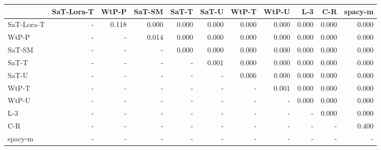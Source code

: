 \begin{tabular}{lrrrrrrrrrr}
\toprule
 & SaT-Lora-T & WtP-P & SaT-SM & SaT-T & SaT-U & WtP-T & WtP-U & L-3 & C-R & spacy-m \\
\midrule
SaT-Lora-T & - & 0.118 & 0.000 & 0.000 & 0.000 & 0.000 & 0.000 & 0.000 & 0.000 & 0.000 \\
WtP-P & - & - & 0.014 & 0.000 & 0.000 & 0.000 & 0.000 & 0.000 & 0.000 & 0.000 \\
SaT-SM & - & - & - & 0.000 & 0.000 & 0.000 & 0.000 & 0.000 & 0.000 & 0.000 \\
SaT-T & - & - & - & - & 0.001 & 0.000 & 0.000 & 0.000 & 0.000 & 0.000 \\
SaT-U & - & - & - & - & - & 0.006 & 0.000 & 0.000 & 0.000 & 0.000 \\
WtP-T & - & - & - & - & - & - & 0.001 & 0.000 & 0.000 & 0.000 \\
WtP-U & - & - & - & - & - & - & - & 0.000 & 0.000 & 0.000 \\
L-3 & - & - & - & - & - & - & - & - & 0.000 & 0.000 \\
C-R & - & - & - & - & - & - & - & - & - & 0.400 \\
spacy-m & - & - & - & - & - & - & - & - & - & - \\
\bottomrule
\end{tabular}

